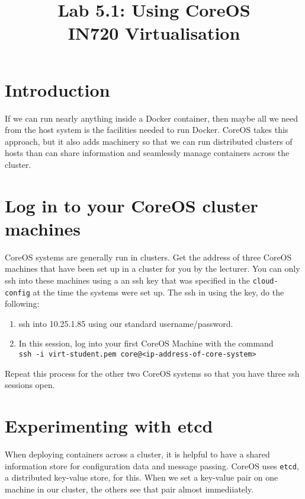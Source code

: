 \documentclass{article}
\begin{document}
\title{Lab 5.1: Using CoreOS \\ IN720 Virtualisation}
\date{}
\maketitle

\section*{Introduction}
If we can run nearly anything inside a Docker container, then maybe all we need from the host system is the facilities needed to run Docker. CoreOS takes this approach, but it also adds machinery so that we can run distributed clusters of hosts than can share information and seamlessly manage containers across the cluster.

\section{Log in to your CoreOS cluster machines}
CoreOS systems are generally run in clusters.  Get the address of three CoreOS machines that have been set up in a cluster for you by the lecturer. You can only ssh into these machines using a an ssh key that was specified in the \texttt{cloud-config} at the time the systems were set up.  The ssh in using the key, do the following:

\begin{enumerate}
	\item ssh into 10.25.1.85 using our standard username/password.
	\item In this session, log into your first CoreOS Machine with the command \\
	      \texttt{ssh -i virt-student.pem core@<ip-address-of-core-system>}
\end{enumerate}

Repeat this process for the other two CoreOS systems so that you have three ssh sessions open.


\section{Experimenting with etcd}
When deploying containers across a cluster, it is helpful to have a shared information store for configuration data and message passing. CoreOS uses \texttt{etcd}, a distributed key-value store, for this. When we set a key-value pair on one machine in our cluster, the others see that pair almost immediiately.
\end{document}
